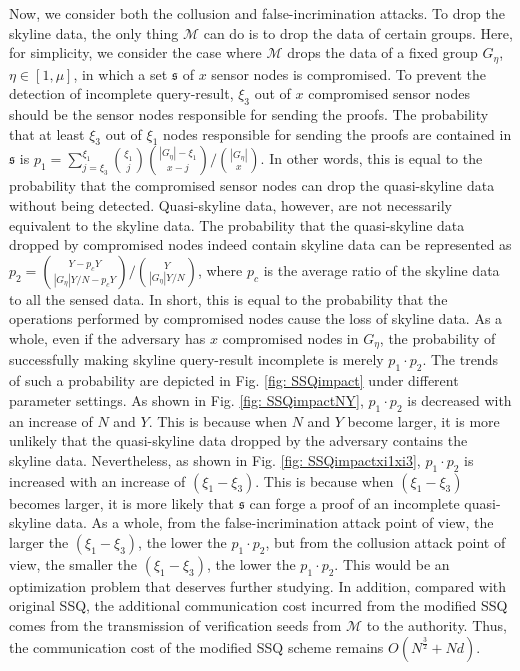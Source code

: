 \documentclass[conference]{IEEEtran}
\begin{document}
Now, we consider both the collusion and false-incrimination attacks. To drop the skyline data, the only thing $\mathcal{M}$ can do is to drop the data of certain groups. Here, for simplicity, we consider the case where $\mathcal{M}$ drops the data of a fixed group $G_\eta$, $\eta\in[1,\mu]$, in which a set $\mathfrak{s}$ of $x$ sensor nodes is compromised. To prevent the detection of incomplete query-result, $\xi_3$ out of $x$ compromised sensor nodes should be the sensor nodes responsible for sending the proofs. The probability that at least $\xi_3$ out of $\xi_1$ nodes responsible for sending the proofs are contained in $\mathfrak{s}$ is $p_1=\sum_{j=\xi_3}^{\xi_1}{\xi_1\choose j}{|G_\eta|-\xi_1\choose x-j}/{|G_\eta|\choose x}$. In other words, this is equal to the probability that the compromised sensor nodes can drop the quasi-skyline data without being detected.  Quasi-skyline data, however, are not necessarily equivalent to the skyline data. The probability that the quasi-skyline data dropped by compromised nodes indeed contain skyline data can be represented as $p_2={Y-p_cY\choose |G_\eta|Y/N-p_cY}/{Y\choose |G_\eta|Y/N}$, where $p_c$ is the average ratio of the skyline data to all the sensed data. In short, this is equal to the probability that the operations performed by compromised nodes cause the loss of skyline data. As a whole, even if the adversary has $x$ compromised nodes in $G_\eta$, the probability of successfully making skyline query-result incomplete is merely $p_1\cdot p_2$. The trends of such a probability are depicted in Fig. \ref{fig: SSQimpact} under different parameter settings. As shown in Fig. \ref{fig: SSQimpactNY}, $p_1\cdot p_2$ is decreased with an increase of $N$ and $Y$. This is because when $N$ and $Y$ become larger, it is more unlikely that the quasi-skyline data dropped by the adversary contains the skyline data. Nevertheless, as shown in Fig. \ref{fig: SSQimpactxi1xi3}, $p_1\cdot p_2$ is increased with an increase of $(\xi_1-\xi_3)$. This is because when $(\xi_1-\xi_3)$ becomes larger, it is more likely that $\mathfrak{s}$ can forge a proof of an incomplete quasi-skyline data. As a whole, from the false-incrimination attack point of view, the larger the $(\xi_1-\xi_3)$, the lower the $p_1\cdot p_2$, but from the collusion attack point of view, the smaller the $(\xi_1-\xi_3)$, the lower the $p_1\cdot p_2$. This would be an optimization problem that deserves further studying. In addition, compared with original SSQ, the additional communication cost incurred from the modified SSQ comes from the transmission of verification seeds from $\mathcal{M}$ to the authority. Thus, the communication cost of the modified SSQ scheme remains $O(N^{\frac{3}{2}}+Nd)$.
\end{document}
